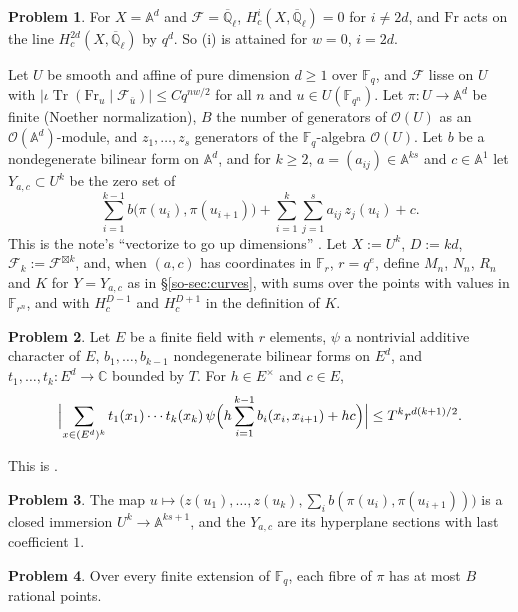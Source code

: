 \documentclass[reqno]{amsart}
\theoremstyle{definition}
\newtheorem{problem}{Problem}[section]
\theoremstyle{plain}
\newcommand{\Q}{\mathbb{Q}}
\newcommand{\C}{\mathbb{C}}
\newcommand{\F}{\mathbb{F}}
\newcommand{\A}{\mathbb{A}}
\newcommand{\Ql}{\overline{\Q}_\ell}
\newcommand{\cF}{\mathcal{F}}
\newcommand{\Fr}{\mathrm{Fr}}
\newcommand{\Tr}{\operatorname{Tr}}
\begin{document}
\begin{problem}\label{pr:affine}
For \(X = \A^d\) and \(\cF = \Ql\), \(H^i_c(X, \Ql) = 0\) for \(i \ne 2d\), and \(\Fr\) acts on the line \(H^{2d}_c(X, \Ql)\) by \(q^d\).  So (i) is attained for \(w = 0\), \(i = 2d\).
\end{problem}

Let \(U\) be smooth and affine of pure dimension \(d \ge 1\) over \(\F_q\), and \(\cF\) lisse on \(U\) with \(\lvert \iota\Tr(\Fr_u \mid \cF_{\bar u}) \rvert \le C q^{nw/2}\) for all \(n\) and \(u \in U(\F_{q^n})\).  Let \(\pi \colon U \to \A^d\) be finite (Noether normalization), \(B\) the number of generators of \(\mathcal O(U)\) as an \(\mathcal O(\A^d)\)-module, and \(z_1, \dots, z_s\) generators of the \(\F_q\)-algebra \(\mathcal O(U)\).  Let \(b\) be a nondegenerate bilinear form on \(\A^d\), and for \(k \ge 2\), \(a = (a_{ij}) \in \A^{ks}\) and \(c \in \A^1\) let \(Y_{a,c} \subset U^k\) be the zero set of
\[
  \sum_{i=1}^{k-1} b\bigl(\pi(u_i), \pi(u_{i+1})\bigr) + \sum_{i=1}^{k} \sum_{j=1}^{s} a_{ij}\, z_j(u_i) + c .
\]
This is the note's ``vectorize to go up dimensions'' \cite[footnote~3]{Alp}.  Let \(X := U^k\), \(D := kd\), \(\cF_k := \cF^{\boxtimes k}\), and, when \((a, c)\) has coordinates in \(\F_r\), \(r = q^e\), define \(M_n\), \(N_n\), \(R_n\) and \(K\) for \(Y = Y_{a,c}\) as in \S\ref{so-sec:curves}, with sums over the points with values in \(\F_{r^n}\), and with \(H^{D-1}_c\) and \(H^{D+1}_c\) in the definition of \(K\).

\begin{problem}\label{pr:vector-d}
Let \(E\) be a finite field with \(r\) elements, \(\psi\) a nontrivial additive character of \(E\), \(b_1, \dots, b_{k-1}\) nondegenerate bilinear forms on \(E^d\), and \(t_1, \dots, t_k \colon E^d \to \C\) bounded by \(T\).  For \(h \in E^\times\) and \(c \in E\),
\[
  \Bigl\lvert \sum_{x \in (E^d)^k} t_1(x_1) \cdots t_k(x_k)\, \psi\Bigl(h \sum_{i=1}^{k-1} b_i(x_i, x_{i+1}) + hc\Bigr) \Bigr\rvert \le T^k r^{d(k+1)/2}.
\]
\end{problem}

This is \cite[Lemma~3]{Ald}.

\begin{problem}\label{pr:Gamma-d}
The map \(u \mapsto \bigl(z(u_1), \dots, z(u_k), \sum_i b(\pi(u_i), \pi(u_{i+1}))\bigr)\) is a closed immersion \(U^k \to \A^{ks+1}\), and the \(Y_{a,c}\) are its hyperplane sections with last coefficient \(1\).
\end{problem}

\begin{problem}\label{pr:fibres}
Over every finite extension of \(\F_q\), each fibre of \(\pi\) has at most \(B\) rational points.
\end{problem}
\end{document}

